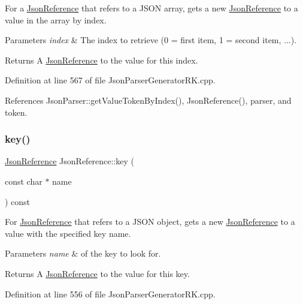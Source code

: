 For a \hyperlink{class_json_reference}{Json\+Reference} that refers to a J\+S\+ON array, gets a new \hyperlink{class_json_reference}{Json\+Reference} to a value in the array by index. 


\begin{DoxyParams}{Parameters}
{\em index} & The index to retrieve (0 = first item, 1 = second item, ...).\\
\hline
\end{DoxyParams}
\begin{DoxyReturn}{Returns}
A \hyperlink{class_json_reference}{Json\+Reference} to the value for this index. 
\end{DoxyReturn}


Definition at line 567 of file Json\+Parser\+Generator\+R\+K.\+cpp.



References Json\+Parser\+::get\+Value\+Token\+By\+Index(), Json\+Reference(), parser, and token.

\mbox{\label{class_json_reference_abb7263eb5a84a137f0ed45631993d171}} 
\subsubsection{\texorpdfstring{key()}{key()}}
{\footnotesize\ttfamily \hyperlink{class_json_reference}{Json\+Reference} Json\+Reference\+::key (\begin{DoxyParamCaption}\item[{const char $\ast$}]{name }\end{DoxyParamCaption}) const}



For \hyperlink{class_json_reference}{Json\+Reference} that refers to a J\+S\+ON object, gets a new \hyperlink{class_json_reference}{Json\+Reference} to a value with the specified key name. 


\begin{DoxyParams}{Parameters}
{\em name} & of the key to look for.\\
\hline
\end{DoxyParams}
\begin{DoxyReturn}{Returns}
A \hyperlink{class_json_reference}{Json\+Reference} to the value for this key. 
\end{DoxyReturn}


Definition at line 556 of file Json\+Parser\+Generator\+R\+K.\+cpp.



